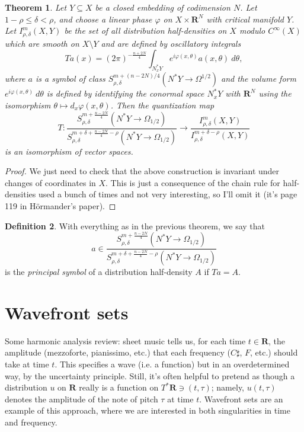 \documentclass[reqno,12pt,letterpaper]{amsart}
\newcommand{\RR}{\mathbf{R}}
\newcommand{\dfn}[1]{\emph{#1}\index{#1}}
\newtheorem{theorem}{Theorem}[section]
\theoremstyle{definition}
\newtheorem{definition}[theorem]{Definition}
\begin{document}
\begin{theorem}
Let $Y \subseteq X$ be a closed embedding of codimension $N$.
Let $1 - \rho \leq \delta < \rho$, and choose a linear phase $\varphi$ on $X \times \RR^N$ with critical manifold $Y$.
Let $I^m_{\rho,\delta}(X, Y)$ be the set of all distribution half-densities on $X$ modulo $C^\infty(X)$ which are smooth on $X \setminus Y$ and are defined by oscillatory integrals
$$Ta(x) = (2\pi)^{-\frac{n+2N}{4}} \int_{N_x^*Y} e^{i\varphi(x, \theta)} a(x, \theta) ~d\theta,$$
where $a$ is a symbol of class $S^{m+(n-2N)/4}_{\rho,\delta}(N^*Y \to \Omega^{1/2})$ and the volume form $e^{i\varphi(x, \theta)}~d\theta$ is defined by identifying the conormal space $N_x^* Y$ with $\RR^N$ using the isomorphism $\theta \mapsto d_x\varphi(x, \theta)$.
Then the quantization map
$$T: \frac{S^{m+\frac{n-2N}{4}}_{\rho,\delta}(N^*Y \to \Omega_{1/2})}{S^{m+\delta+\frac{n-2N}{4}-\rho}_{\rho,\delta}(N^*Y \to \Omega_{1/2})} \to \frac{I^m_{\rho,\delta}(X, Y)}{I^{m+\delta-\rho}_{\rho,\delta}(X,Y)}$$
is an isomorphism of vector spaces.
\end{theorem}
\begin{proof}
We just need to check that the above construction is invariant under changes of coordinates in $X$.
This is just a consequence of the chain rule for half-densities used a bunch of times and not very interesting, so I'll omit it (it's page 119 in H\"ormander's paper).
\end{proof}

\begin{definition}
With everything as in the previous theorem, we say that
$$a \in \frac{S^{m+\frac{n-2N}{4}}_{\rho,\delta}(N^*Y \to \Omega_{1/2})}{S^{m+\delta+\frac{n-2N}{4}-\rho}_{\rho,\delta}(N^*Y \to \Omega_{1/2})}$$
is the \dfn{principal symbol} of a distribution half-density $A$ if $Ta = A$.
\end{definition}

\section{Wavefront sets}
Some harmonic analysis review: sheet music tells us, for each time $t \in \RR$, the amplitude (mezzoforte, pianissimo, etc.) that each frequency ($C\sharp$, $F$, etc.) should take at time $t$.
This specifies a wave (i.e. a function) but in an overdetermined way, by the uncertainty principle.
Still, it's often helpful to pretend as though a distribution $u$ on $\RR$ really is a function on $T^*\RR \ni (t, \tau)$; namely, $u(t, \tau)$ denotes the amplitude of the note of pitch $\tau$ at time $t$.
Wavefront sets are an example of this approach, where we are interested in both singularities in time and frequency.
\end{document}
